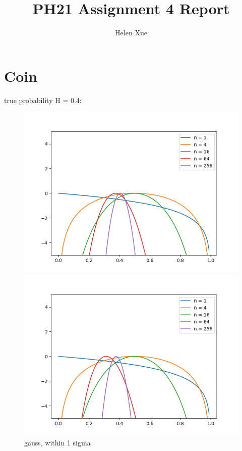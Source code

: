 \documentclass[english]{scrartcl}
\title{PH21 Assignment 4 Report}
\author{Helen Xue}
\begin{document}
\maketitle

\section{Coin}
\par true probability H = 0.4:
\begin{figure}[H]
	\includegraphics[width=\linewidth]{coin/h=0.4/gauss_1sigma}
	\caption{gauss, within 1 sigma}  
	\endminipage \hfill
	\includegraphics[width=\linewidth]{coin/h=0.4/gauss_3sigma}

\end{figure}
\end{document}
